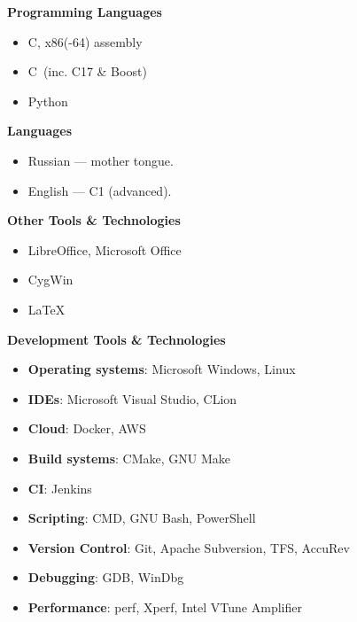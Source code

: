 \documentclass[11pt]{article}
\newcommand\CXX{C\nolinebreak[4]\hspace{-.05em}\raisebox{.4ex}{\relsize{-3}{\textbf{++}}}}
\newcommand\CvBigSkipLength{1em}
\newcommand\CvSkip[1]{\vspace{#1}}
\newcommand\CvBigSkip{\CvSkip{\CvBigSkipLength}}
\newcommand\CvSectionHeader[1]{\CvBigSkip\textbf{#1}\CvBigSkip}
\begin{document}
\begin{minipage}[t]{.5\linewidth}
  \CvSectionHeader{Programming Languages}

  \begin{itemize}
    \item C, x86(-64) assembly
    \item \CXX\ (inc. {\CXX}17 \& Boost)
    \item Python
  \end{itemize}

  \CvSectionHeader{Languages}

  \begin{itemize}
    \item Russian --- mother tongue.
    \item English --- C1 (advanced).
  \end{itemize}

  \CvSectionHeader{Other Tools \& Technologies}

  \begin{itemize}
    \item LibreOffice, Microsoft Office
    \item CygWin
    \item \LaTeX
  \end{itemize}

\end{minipage}
\begin{minipage}[t]{.5\linewidth}
  \CvSectionHeader{Development Tools \& Technologies}

  \begin{itemize}
    \item \textbf{Operating systems}: Microsoft Windows, Linux
    \item \textbf{IDEs}: Microsoft Visual Studio, CLion
    \item \textbf{Cloud}: Docker, AWS
    \item \textbf{Build systems}: CMake, GNU Make
    \item \textbf{CI}: Jenkins
    \item \textbf{Scripting}: CMD, GNU Bash, PowerShell
    \item \textbf{Version Control}: Git, Apache Subversion, TFS, AccuRev
    \item \textbf{Debugging}: GDB, WinDbg
    \item \textbf{Performance}: perf, Xperf, Intel VTune Amplifier
  \end{itemize}
\end{minipage}
\end{document}
